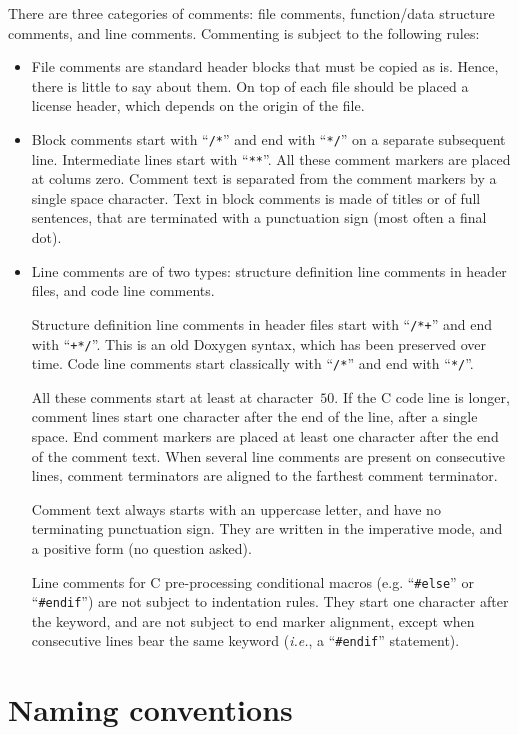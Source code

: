 There are three categories of comments: file comments, function/data
structure comments, and line comments. Commenting is subject to the
following rules:
\begin{itemize}
\item
  File comments are standard header blocks that must be copied as
  is. Hence, there is little to say about them. On top of each file
  should be placed a license header, which depends on the origin of
  the file.
\item
  Block comments start with ``\texttt{/*}'' and end with
  ``\texttt{*/}'' on a separate subsequent line. Intermediate lines
  start with ``\texttt{**}''. All these comment markers are placed at
  colums zero. Comment text is separated from the comment markers by a
  single space character. Text in block comments is made of titles or
  of full sentences, that are terminated with a punctuation sign (most
  often a final dot).
\item
  Line comments are of two types: structure definition line comments
  in header files, and code line comments.

  Structure definition line comments in header files start with
  ``\texttt{/*+}'' and end with ``\texttt{+*/}''. This is an old
  Doxygen syntax, which has been preserved over time. Code line
  comments start classically with ``\texttt{/*}'' and end with
  ``\texttt{*/}''.

  All these comments start at least at character~$50$. If the C code
  line is longer, comment lines start one character after the end of
  the line, after a single space. End comment markers are placed at
  least one character after the end of the comment text. When several
  line comments are present on consecutive lines, comment terminators
  are aligned to the farthest comment terminator.

  Comment text always starts with an uppercase letter, and have no
  terminating punctuation sign. They are written in the imperative
  mode, and a positive form (no question asked).

  Line comments for C pre-processing conditional macros
  (e.g. ``\texttt{\#else}'' or ``\texttt{\#endif}'') are not subject
  to indentation rules. They start one character after the keyword,
  and are not subject to end marker alignment, except when consecutive
  lines bear the same keyword (\textit{i.e.}, a ``\texttt{\#endif}''
  statement).
\end{itemize}

\section{Naming conventions}
\label{sec-naming}

